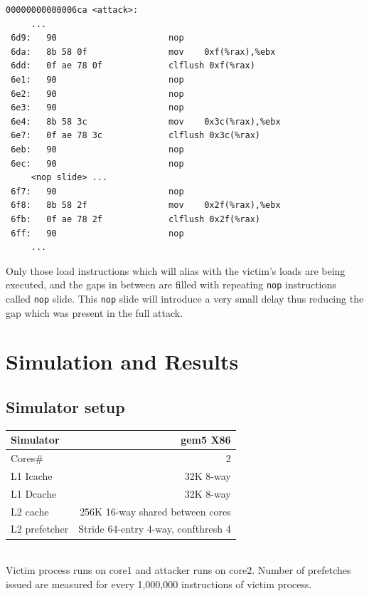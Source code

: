 \begin{lstlisting}[caption={Attacker targeting specific PC addresses},
label={lst:targeted_attack}]
00000000000006ca <attack>:
     ...
 6d9:   90                      nop
 6da:   8b 58 0f                mov    0xf(%rax),%ebx
 6dd:   0f ae 78 0f             clflush 0xf(%rax)
 6e1:   90                      nop
 6e2:   90                      nop
 6e3:   90                      nop
 6e4:   8b 58 3c                mov    0x3c(%rax),%ebx
 6e7:   0f ae 78 3c             clflush 0x3c(%rax)
 6eb:   90                      nop
 6ec:   90                      nop
     <nop slide> ...
 6f7:   90                      nop
 6f8:   8b 58 2f                mov    0x2f(%rax),%ebx
 6fb:   0f ae 78 2f             clflush 0x2f(%rax)
 6ff:   90                      nop
     ...
\end{lstlisting}

Only those load instructions which will alias with the victim's loads are
being executed, and the gaps in between are filled with repeating \texttt{nop}
instructions called \texttt{nop} slide. This \texttt{nop} slide will introduce
a very small delay thus reducing the gap which was present in the full attack.

\pagebreak
\section{Simulation and Results}

\subsection{Simulator setup}

\begin{tabular}{|l|r|}
\hline
Simulator  & gem5 X86\\
\hline
Cores#  & 2\\
\hline
L1 Icache & 32K 8-way\\
\hline
L1 Dcache & 32K 8-way\\
\hline
L2 cache & 256K 16-way shared between cores\\
\hline
L2 prefetcher  & Stride 64-entry 4-way, confthresh 4\\
\hline
\end{tabular}
\\

Victim process runs on core1 and attacker runs on core2. Number of prefetches
issued are measured for every 1,000,000 instructions of victim process.

